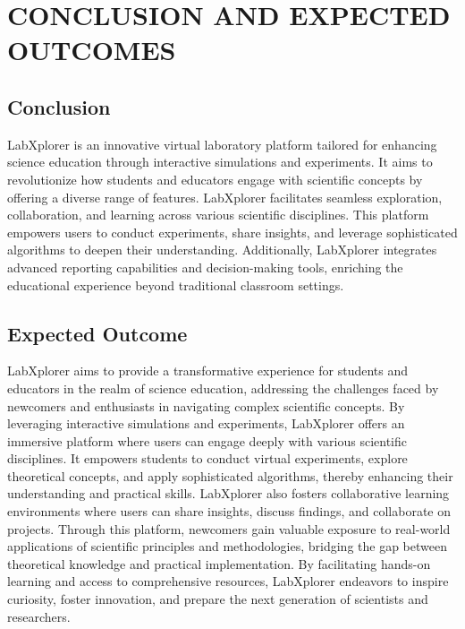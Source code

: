 \chapter{CONCLUSION AND EXPECTED OUTCOMES}
\section{Conclusion}
LabXplorer is an innovative virtual laboratory platform tailored for enhancing science education through interactive simulations and experiments. It aims to revolutionize how students and educators engage with scientific concepts by offering a diverse range of features. LabXplorer facilitates seamless exploration, collaboration, and learning across various scientific disciplines. This platform empowers users to conduct experiments, share insights, and leverage sophisticated algorithms to deepen their understanding. Additionally, LabXplorer integrates advanced reporting capabilities and decision-making tools, enriching the educational experience beyond traditional classroom settings.
\section{Expected Outcome}
LabXplorer aims to provide a transformative experience for students and educators in the realm of science education, addressing the challenges faced by newcomers and enthusiasts in navigating complex scientific concepts. By leveraging interactive simulations and experiments, LabXplorer offers an immersive platform where users can engage deeply with various scientific disciplines. It empowers students to conduct virtual experiments, explore theoretical concepts, and apply sophisticated algorithms, thereby enhancing their understanding and practical skills. LabXplorer also fosters collaborative learning environments where users can share insights, discuss findings, and collaborate on projects. Through this platform, newcomers gain valuable exposure to real-world applications of scientific principles and methodologies, bridging the gap between theoretical knowledge and practical implementation. By facilitating hands-on learning and access to comprehensive resources, LabXplorer endeavors to inspire curiosity, foster innovation, and prepare the next generation of scientists and researchers.